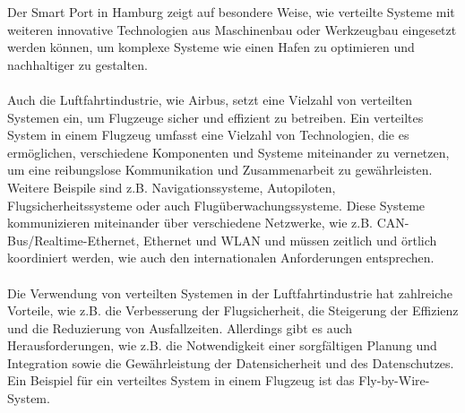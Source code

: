 \documentclass[../vs-script-first-v01.tex]{subfiles}
\begin{document}
Der Smart Port in Hamburg zeigt auf besondere Weise, wie verteilte Systeme mit weiteren innovative Technologien aus Maschinenbau oder Werkzeugbau  eingesetzt werden können\cite{Bockenfeld2020}, um komplexe Systeme wie einen Hafen zu optimieren und nachhaltiger zu gestalten.
\\\\
Auch die Luftfahrtindustrie, wie Airbus, setzt eine Vielzahl von verteilten Systemen ein, um Flugzeuge sicher und effizient zu betreiben. Ein verteiltes System in einem Flugzeug umfasst eine Vielzahl von Technologien, die es ermöglichen, verschiedene Komponenten und Systeme miteinander zu vernetzen, um eine reibungslose Kommunikation und Zusammenarbeit zu gewährleisten\cite{chen2017distributed}. Weitere Beispile sind z.B. Navigationssysteme, Autopiloten, Flugsicherheitssysteme oder auch Flugüberwachungssysteme. Diese Systeme kommunizieren miteinander über verschiedene Netzwerke, wie z.B. CAN-Bus/Realtime-Ethernet, Ethernet und WLAN und müssen zeitlich und örtlich koordiniert werden, wie auch den internationalen Anforderungen entsprechen.
\\\\
Die Verwendung von verteilten Systemen in der Luftfahrtindustrie hat zahlreiche Vorteile, wie z.B. die Verbesserung der Flugsicherheit, die Steigerung der Effizienz und die Reduzierung von Ausfallzeiten. Allerdings gibt es auch Herausforderungen, wie z.B. die Notwendigkeit einer sorgfältigen Planung und Integration sowie die Gewährleistung der Datensicherheit und des Datenschutzes. Ein Beispiel für ein verteiltes System in einem Flugzeug ist das Fly-by-Wire-System. 
\end{document}

